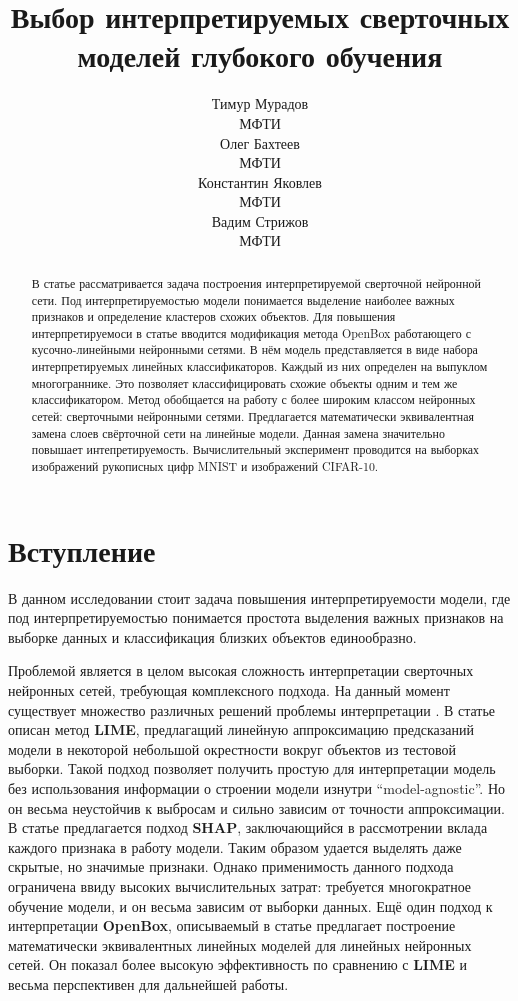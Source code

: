 \documentclass[12pt]{article}
\title{Выбор интерпретируемых сверточных моделей глубокого обучения}
\author{ Тимур Мурадов\\
	МФТИ\\
	\And
	Олег Бахтеев \\
	МФТИ\\
	\And
	Константин Яковлев \\
	МФТИ\\
	\And
	Вадим Стрижов \\
	МФТИ\\
}
\date{}
\begin{document}
\maketitle

\begin{abstract}
	В статье рассматривается задача построения интерпретируемой сверточной нейронной сети. Под интерпретируемостью модели понимается выделение наиболее важных признаков и определение кластеров схожих объектов. Для повышения интерпретируемоси в статье вводится модификация метода OpenBox работающего с  кусочно-линейными нейронными сетями. В нём модель представляется в виде набора интерпретируемых линейных классификаторов. Каждый из них определен на выпуклом многограннике. Это позволяет классифицировать схожие объекты одним и тем же классификатором. Метод обобщается на работу с более широким классом нейронных сетей: сверточными нейронными сетями. Предлагается математически эквивалентная замена слоев свёрточной сети на линейные модели. Данная замена  значительно повышает интепретируемость. Вычислительный эксперимент проводится на выборках изображений рукописных цифр MNIST и изображений CIFAR-10.
\end{abstract}



\section{Вступление}
В данном исследовании стоит задача повышения интерпретируемости модели, где под интерпретируемостью понимается простота выделения важных признаков на выборке данных и классификация близких объектов единообразно.

Проблемой является в целом высокая сложность интерпретации сверточных нейронных сетей, требующая комплексного подхода. На данный момент существует множество различных решений проблемы интерпретации \cite{ribeiro2016why, Lundberg2017aunified, chu2019exact} . В статье \cite{ribeiro2016why} описан метод \textbf{LIME}, предлагащий линейную аппроксимацию предсказаний модели в некоторой небольшой окрестности вокруг объектов из тестовой выборки. Такой подход позволяет получить простую для интерпретации модель без использования информации о строении модели изнутри \textquotedblleft model-agnostic\textquotedblright. Но он весьма неустойчив к выбросам и сильно зависим от точности аппроксимации. В статье \cite{Lundberg2017aunified} предлагается подход \textbf{SHAP}, заключающийся в рассмотрении вклада каждого признака в работу модели. Таким образом удается выделять даже скрытые, но значимые признаки. Однако применимость данного подхода ограничена ввиду высоких вычислительных затрат: требуется многократное обучение модели, и он весьма зависим от выборки данных. Ещё один подход к интерпретации \textbf{OpenBox}, описываемый в статье \cite{chu2019exact} предлагает построение математически эквивалентных линейных моделей для линейных нейронных сетей. Он показал более высокую эффективность по сравнению с \textbf{LIME} и весьма перспективен для дальнейшей работы.
\end{document}
